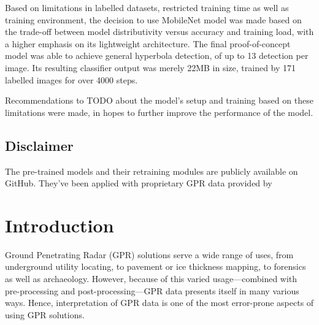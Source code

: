 \documentclass[se,blockletter]{uw-wkrpt}
\begin{document}
Based on limitations in labelled datasets, restricted training time as well as training environment, the decision to use MobileNet model was made based on the trade-off between model distributivity versus accuracy and training load, with a higher emphasis on its lightweight architecture. The final proof-of-concept model was able to achieve general hyperbola detection, of up to 13 detection per image. Its resulting classifier output was merely 22MB in size, trained by 171 labelled images for over 4000 steps.

Recommendations to TODO about the model's setup and training based on these limitations were made, in hopes to further improve the performance of the model. 

\subsection{Disclaimer}
The pre-trained models and their retraining modules are publicly available on GitHub. They've been applied with proprietary GPR data provided by \thecompany{}  

\tableofcontents
\listoffigures
\listoftables

\mainmatter

\section{Introduction}\label{sec:intro}
Ground Penetrating Radar (GPR) solutions serve a wide range of uses, from underground utility locating, to pavement or ice thickness mapping, to forensics as well as archaeology. However, because of this varied usage---combined with pre-processing and post-processing---GPR data presents itself in many various ways. Hence, interpretation of GPR data is one of the most error-prone aspects of using GPR solutions.
\end{document}
